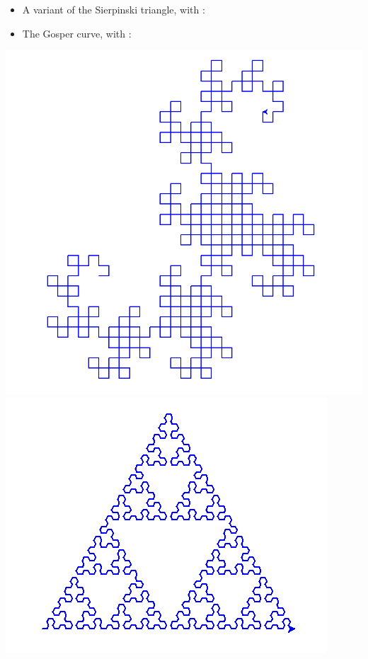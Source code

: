 \documentclass[11pt,class=report,crop=false]{standalone}
\begin{document}
\begin{activite}
\begin{enumerate}
\begin{itemize}
	\item A variant of the Sierpinski triangle, with  :	

\item The Gosper curve, with :
	  
	\end{itemize}
	
\begin{center}
\includegraphics[scale=\myscale,scale=0.15]{screen-lsystems-8}\quad
\includegraphics[scale=\myscale,scale=0.33]{screen-lsystems-9}\quad

\end{center}
\end{enumerate}
\end{activite}
\end{document}
